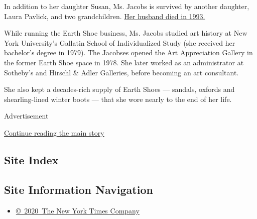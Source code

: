 In addition to her daughter Susan, Ms. Jacobs is survived by another
daughter, Laura Pavlick, and two grandchildren.
\href{https://www.nytimes3xbfgragh.onion/1993/03/20/obituaries/raymond-jacobs-69-co-founder-of-earth-shoe-company-in-1970-s.html}{Her
husband died in 1993.}

While running the Earth Shoe business, Ms. Jacobs studied art history at
New York University's Gallatin School of Individualized Study (she
received her bachelor's degree in 1979). The Jacobses opened the Art
Appreciation Gallery in the former Earth Shoe space in 1978. She later
worked as an administrator at Sotheby's and Hirschl \& Adler Galleries,
before becoming an art consultant.

She also kept a decades-rich supply of Earth Shoes --- sandals, oxfords
and shearling-lined winter boots --- that she wore nearly to the end of
her life.

Advertisement

\protect\hyperlink{after-bottom}{Continue reading the main story}

\hypertarget{site-index}{%
\subsection{Site Index}\label{site-index}}

\hypertarget{site-information-navigation}{%
\subsection{Site Information
Navigation}\label{site-information-navigation}}

\begin{itemize}
\tightlist
\item
  \href{https://help.nytimes3xbfgragh.onion/hc/en-us/articles/115014792127-Copyright-notice}{©~2020~The
  New York Times Company}
\end{itemize}

